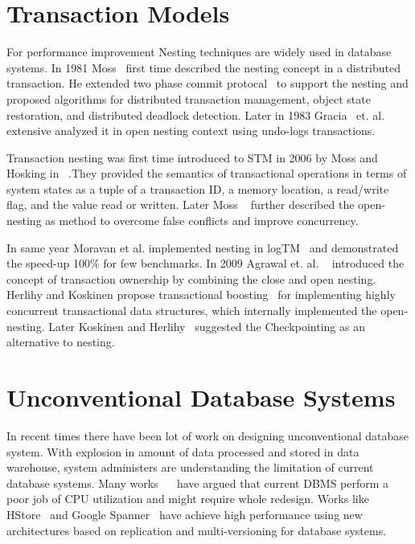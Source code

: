 \documentclass[12pt,english]{report}
\begin{document}
\section{Transaction Models}

For performance improvement Nesting techniques are widely used in database systems. In 1981 Moss~\cite{moss1981nested} first time described the nesting concept in a distributed transaction. He extended two phase commit protocal~\cite{TwoPC:weikum1991principles} to support the nesting and proposed algorithms for distributed transaction management, object state restoration, and distributed deadlock detection. Later in 1983 Gracia~\cite{garcia1983using} et. al. extensive analyzed it in open nesting context using undo-logs transactions. 

Transaction nesting was first time introduced to STM in 2006 by  Moss and Hosking in ~\cite{moss2006nested}.They provided the semantics of transactional operations in terms of system states as a tuple of a transaction ID, a memory location, a read/write flag, and the value read or written. Later Moss ~\cite{moss2006open} further described the open-nesting as method to overcome false conflicts and improve concurrency. 

In same year Moravan et al. implemented nesting in logTM~\cite{moravan2006supporting} and demonstrated the speed-up 100\% for few benchmarks. In 2009 Agrawal et. al. ~\cite{agrawal2009safe} introduced the concept of transaction ownership by combining the close and open nesting. Herlihy and Koskinen propose transactional boosting~\cite{herlihy2008transactional} for implementing highly concurrent transactional data structures, which internally implemented the open-nesting. Later Koskinen and Herlihy~\cite{koskinen2008checkpoints} suggested the Checkpointing as an alternative to nesting.

\section{Unconventional Database Systems}
In recent times there have been lot of work on designing unconventional database system. With explosion in amount of data processed and stored in data warehouse, system administers are understanding the limitation of current database systems. Many works ~\cite{Stonebraker:2007:EAE:1325851.1325981}~\cite{harizopoulos2008oltp} have argued that current DBMS perform a poor job of CPU utilization and might require whole redesign. Works like HStore~\cite{HSTORE:kallman2008h} and Google Spanner~\cite{corbett2012spanner} have achieve high performance using new architectures based on replication and multi-versioning for database systems. 
\end{document}

